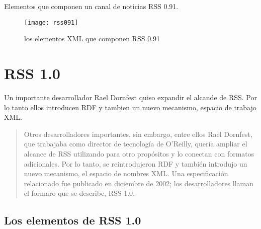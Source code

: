 \normalsize

\begin{center}

Elementos que componen un canal de noticias RSS 0.91.

\end{center}

\begin{figure}[!htb]
\centering
\texttt{[image: rss091]}
\caption{los elementos XML que componen RSS 0.91}
\end{figure}


\section{RSS 1.0}

Un importante desarrollador Rael Dornfest quiso expandir el alcande de RSS. Por lo tanto ellos introducen
RDF y tambien un nuevo mecanismo, espacio de trabajo XML.

\scriptsize

\blockquote{

Otros desarrolladores importantes, sin embargo, entre ellos Rael Dornfest, que trabajaba como director de
tecnolog\'{i}a de O'Reilly, quer\'{i}a ampliar el alcance de RSS utilizando para otro prop\'{o}sitos y lo
conectan con formatos adicionales. Por lo tanto, se reintrodujeron RDF y tambi\'{e}n introdujo un nuevo
mecanismo, el espacio de nombres XML. Una especificaci\'{o}n relacionado fue publicado en diciembre de 2002;
los desarrolladores llaman el formaro que se describe, RSS 1.0.\cite{johnson2006rss}
}
 
\normalsize

\subsection{Los elementos de RSS 1.0}

\scriptsize

